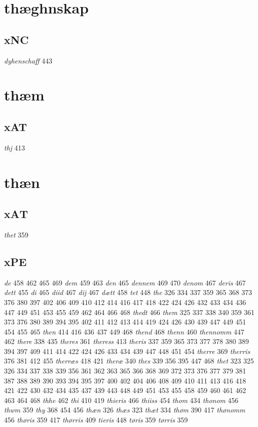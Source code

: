 \documentclass[a4paper,twocolumn]{article}
\begin{document}
\section{thæghnskap}
\label{sec:orga38b50b}
\subsection{xNC}
\label{sec:orgf5c3a04}
\emph{dyhenschaff} 443 
\section{thæm}
\label{sec:org7b3238c}
\subsection{xAT}
\label{sec:orgab71234}
\emph{thj} 413 
\section{thæn}
\label{sec:orgd4ce7d5}
\subsection{xΑΤ}
\label{sec:orga3787a7}
\emph{thet} 359 
\subsection{xPE}
\label{sec:org5c03857}
\emph{de} 458 462 465 469 \emph{dem} 459 463 \emph{den} 465 \emph{dennem} 469 470 \emph{denom} 467 \emph{deris} 467 \emph{dett} 455 \emph{di} 465 \emph{diid} 467 \emph{dij} 467 \emph{dætt} 458 \emph{tet} 448 \emph{the} 326 334 337 359 365 368 373 376 380 397 402 406 409 410 412 414 416 417 418 422 424 426 432 433 434 436 447 449 451 453 455 459 462 464 466 468 \emph{thedt} 466 \emph{them} 325 337 338 340 359 361 373 376 380 389 394 395 402 411 412 413 414 419 424 426 430 439 447 449 451 454 455 465 \emph{then} 414 416 436 437 449 468 \emph{thend} 468 \emph{thenn} 460 \emph{thennomm} 447 462 \emph{there} 338 435 \emph{theres} 361 \emph{theress} 413 \emph{theris} 337 359 365 373 377 378 380 389 394 397 409 411 414 422 424 426 433 434 439 447 448 451 454 \emph{therre} 369 \emph{therris} 376 381 412 455 \emph{therræs} 418 421 \emph{theræ} 340 \emph{thes} 339 356 395 447 468 \emph{thet} 323 325 326 334 337 338 339 356 361 362 363 365 366 368 369 372 373 376 377 379 381 387 388 389 390 393 394 395 397 400 402 404 406 408 409 410 411 413 416 418 421 422 430 432 434 435 437 439 443 448 449 451 453 455 458 459 460 461 462 463 464 468 \emph{thhe} 462 \emph{thi} 410 419 \emph{thieris} 466 \emph{thiiss} 454 \emph{thom} 434 \emph{thonom} 456 \emph{thwm} 359 \emph{thy} 368 454 456 \emph{thæn} 326 \emph{thæs} 323 \emph{thæt} 334 \emph{thøm} 390 417 \emph{thønomm} 456 \emph{thøris} 359 417 \emph{thørris} 409 \emph{tieris} 448 \emph{tøris} 359 \emph{tørris} 359 
\end{document}
